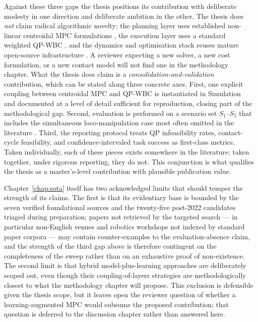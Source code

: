 Against these three gaps the thesis positions its contribution with
deliberate modesty in one direction and deliberate ambition in the
other. The thesis does \emph{not} claim radical algorithmic novelty:
the planning layer uses established non-linear centroidal MPC
formulations \cite{Romualdi2023,Elobaid2023}, the execution layer uses a
standard weighted QP-WBC \cite{Wensing2013,Koolen2016}, and the
dynamics and optimisation stack reuses mature open-source infrastructure
\cite{Pinocchio,Crocoddyl}. A reviewer expecting a new solver, a new
cost formulation, or a new contact model will not find one in the
methodology chapter. What the thesis does claim is a
\emph{consolidation-and-validation} contribution, which can be stated
along three concrete axes. First, one explicit coupling between
centroidal MPC and QP-WBC is instantiated in Simulation and documented
at a level of detail sufficient for reproduction, closing part of the
methodological gap. Second, evaluation is performed on a scenario set
$S_1$--$S_5$ that includes the simultaneous loco-manipulation case most
often omitted in the literature \cite{Sleiman2021,Fernbach2022}. Third,
the reporting protocol treats QP infeasibility rates, contact-cycle
feasibility, and confidence-intervaled task success as first-class
metrics. Taken individually, each of these pieces exists somewhere in
the literature; taken together, under rigorous reporting, they do not.
This conjunction is what qualifies the thesis as a master's-level
contribution with plausible publication value.

\begin{criticalinsight}
Chapter~\ref{chap:sota} itself has two acknowledged limits that should
temper the strength of its claims. The first is that its evidentiary
base is bounded by the seven verified foundational sources and the
twenty-five post-2022 candidates triaged during preparation; papers not
retrieved by the targeted search --- in particular non-English venues
and robotics workshops not indexed by standard paper corpora --- may
contain counter-examples to the evaluation-absence claim, and the
strength of the third gap above is therefore contingent on the
completeness of the sweep rather than on an exhaustive proof of
non-existence. The second limit is that hybrid model-plus-learning
approaches \cite{LeCleach2024,Radosavovic2024} are deliberately scoped
out, even though their coupling-of-layers strategies are methodologically
closest to what the methodology chapter will propose. This exclusion is
defensible given the thesis scope, but it leaves open the reviewer
question of whether a learning-augmented MPC would subsume the proposed
contribution; that question is deferred to the discussion chapter
rather than answered here.
\end{criticalinsight}


